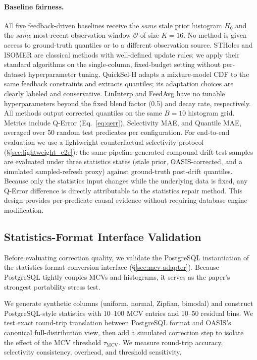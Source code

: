 \documentclass[runningheads]{llncs}
\begin{document}
\paragraph{Baseline fairness.}
All five feedback-driven baselines receive the \emph{same} stale prior histogram $H_0$ and the \emph{same} most-recent observation window $\mathcal{O}$ of size $K{=}16$. No method is given access to ground-truth quantiles or to a different observation source. STHoles and ISOMER are classical methods with well-defined update rules; we apply their standard algorithms on the single-column, fixed-budget setting without per-dataset hyperparameter tuning. QuickSel-H adapts a mixture-model CDF to the same feedback constraints and extracts quantiles; its adaptation choices are clearly labeled and conservative. LinInterp and FeedAvg have no tunable hyperparameters beyond the fixed blend factor (0.5) and decay rate, respectively. All methods output corrected quantiles on the same $B{=}10$ histogram grid. Metrics include Q-Error (Eq.~\ref{eq:qerr}), Selectivity MAE, and Quantile MAE,
averaged over 50 random test predicates per configuration.
For end-to-end evaluation we use a lightweight counterfactual selectivity
protocol (\S\ref{sec:lightweight_e2e}): the same pipeline-generated compound
drift test samples are evaluated under three statistics states (stale prior,
OASIS-corrected, and a simulated sampled-refresh proxy) against ground-truth
post-drift quantiles. Because only the statistics input changes while the
underlying data is fixed, any Q-Error difference is directly attributable to
the statistics repair method. This design provides per-predicate causal
evidence without requiring database engine modification.

\subsection{Statistics-Format Interface Validation}
\label{sec:mcv-validation}

Before evaluating correction quality, we validate the PostgreSQL instantiation of the statistics-format conversion interface (\S\ref{sec:mcv-adapter}). Because PostgreSQL tightly couples MCVs and histograms, it serves as the paper's strongest portability stress test.

We generate synthetic columns (uniform, normal, Zipfian, bimodal) and construct PostgreSQL-style statistics with 10--100 MCV entries and 10--50 residual bins. We test exact round-trip translation between PostgreSQL format and OASIS's canonical full-distribution view, then add a simulated correction step to isolate the effect of the MCV threshold $\tau_{\text{MCV}}$. We measure round-trip accuracy, selectivity consistency, overhead, and threshold sensitivity.
\end{document}
